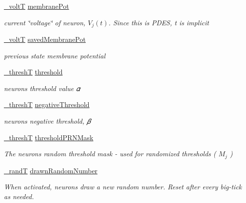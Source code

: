 {\bf }\par
\begin{DoxyCompactItemize}
\item 
\hyperlink{assist_8h_abe1fc1b8f9efd1187e564bcb8de7f815}{\+\_\+volt\+T} \hyperlink{structneuron_state_a0fdd8f44c4105a94e17c4c58a51db486}{membrane\+Pot}
\begin{DoxyCompactList}\small\item\em current \char`\"{}voltage\char`\"{} of neuron, $V_j(t)$. Since this is P\+D\+E\+S, {\itshape t} is implicit \end{DoxyCompactList}\item 
\hyperlink{assist_8h_abe1fc1b8f9efd1187e564bcb8de7f815}{\+\_\+volt\+T} \hyperlink{structneuron_state_a5efe5de0478ea513ed5d90d89a49fcca}{saved\+Membrane\+Pot}
\begin{DoxyCompactList}\small\item\em previous state membrane potential \end{DoxyCompactList}\item 
\hyperlink{assist_8h_a5537d30256d443ce07efd3d879a4a720}{\+\_\+thresh\+T} \hyperlink{structneuron_state_a132470c4c17828c209e3403ccf7ee680}{threshold}
\begin{DoxyCompactList}\small\item\em neuron\textquotesingle{}s threshold value 𝛼 \end{DoxyCompactList}\item 
\hyperlink{assist_8h_a5537d30256d443ce07efd3d879a4a720}{\+\_\+thresh\+T} \hyperlink{structneuron_state_a678bcd9f031e290178cd5d2855e74279}{negative\+Threshold}
\begin{DoxyCompactList}\small\item\em neuron\textquotesingle{}s negative threshold, 𝛽 \end{DoxyCompactList}\item 
\hyperlink{assist_8h_a5537d30256d443ce07efd3d879a4a720}{\+\_\+thresh\+T} \hyperlink{structneuron_state_aa501d6ee7cacd5435deec79c07637b08}{threshold\+P\+R\+N\+Mask}
\begin{DoxyCompactList}\small\item\em The neuron\textquotesingle{}s random threshold mask -\/ used for randomized thresholds ( $M_j$ ) \end{DoxyCompactList}\item 
\hyperlink{assist_8h_a520ac495f188eb0bc5645cffa3c4328b}{\+\_\+rand\+T} \hyperlink{structneuron_state_a296a4f04813c4882d6acd8c9074abd35}{drawn\+Random\+Number}
\begin{DoxyCompactList}\small\item\em When activated, neurons draw a new random number. Reset after every big-\/tick as needed. \end{DoxyCompactList}\item 

\end{DoxyCompactItemize}
